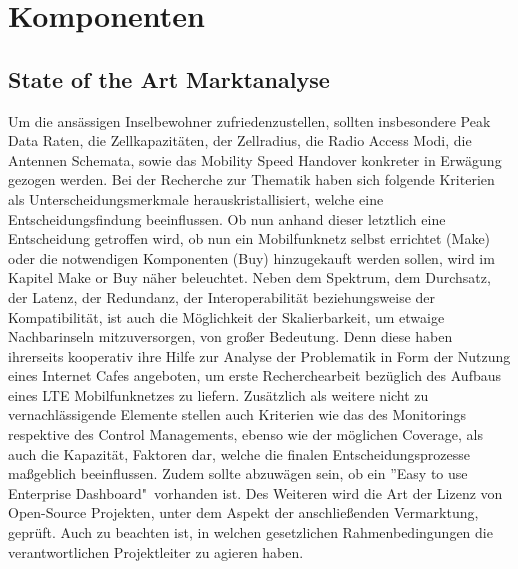 
%
%
% 
% 
% 


\section{Komponenten}
\label{sec:Komponenten}

\subsection{State of the Art Marktanalyse}
\label{subsec:Marktanalyse}

Um die ansässigen Inselbewohner zufriedenzustellen, sollten insbesondere Peak Data Raten, die Zellkapazitäten, der Zellradius, die Radio Access Modi, die Antennen Schemata, sowie das Mobility Speed Handover konkreter in Erwägung gezogen werden\cite{Dat14}.
Bei der Recherche zur Thematik haben sich folgende Kriterien als Unterscheidungsmerkmale herauskristallisiert, welche eine Entscheidungsfindung beeinflussen. Ob nun anhand dieser letztlich eine Entscheidung getroffen wird, ob nun ein Mobilfunknetz selbst errichtet (Make) oder die notwendigen Komponenten (Buy) hinzugekauft werden sollen, wird im Kapitel Make or Buy näher beleuchtet. Neben dem Spektrum, dem Durchsatz, der Latenz, der Redundanz, der Interoperabilität beziehungsweise der Kompatibilität, ist auch die Möglichkeit der Skalierbarkeit, um etwaige Nachbarinseln mitzuversorgen, von großer Bedeutung. Denn diese haben ihrerseits kooperativ ihre Hilfe zur Analyse der Problematik in Form der Nutzung eines Internet Cafes angeboten, um erste Recherchearbeit bezüglich des Aufbaus eines LTE Mobilfunknetzes zu liefern. Zusätzlich  als weitere nicht zu vernachlässigende Elemente stellen auch Kriterien wie das des Monitorings respektive des Control Managements, ebenso wie der möglichen Coverage, als auch die Kapazität, Faktoren dar, welche die finalen Entscheidungsprozesse maßgeblich beeinflussen. Zudem sollte abzuwägen sein, ob ein ''Easy to use Enterprise Dashboard"\ vorhanden ist. Des Weiteren wird die Art der Lizenz von Open-Source Projekten, unter dem Aspekt der anschließenden Vermarktung, geprüft. Auch zu beachten ist, in welchen gesetzlichen Rahmenbedingungen die verantwortlichen Projektleiter zu agieren haben.




\raggedbottom 
